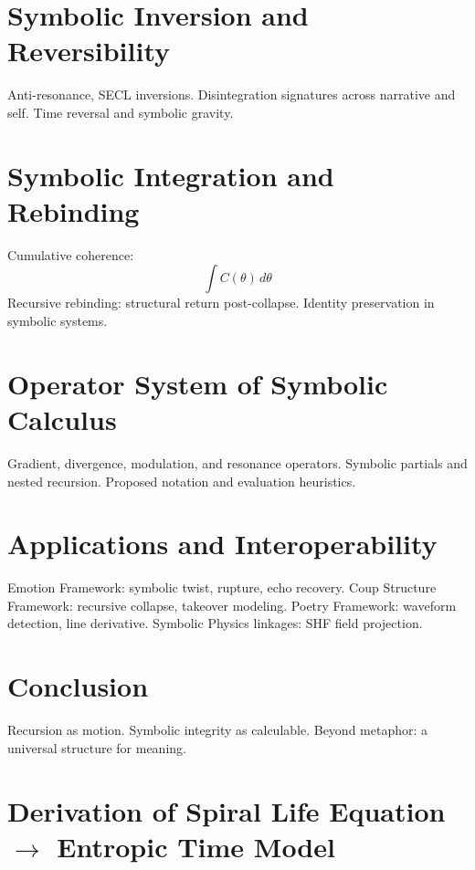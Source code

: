 \documentclass[12pt]{article}
\begin{document}
\section{Symbolic Inversion and Reversibility}
Anti-resonance, SECL inversions.\newline
Disintegration signatures across narrative and self.\newline
Time reversal and symbolic gravity.

\section{Symbolic Integration and Rebinding}
Cumulative coherence:
\[ \int C(\theta) \, d\theta \]
Recursive rebinding: structural return post-collapse.\newline
Identity preservation in symbolic systems.

\section{Operator System of Symbolic Calculus}
Gradient, divergence, modulation, and resonance operators.\newline
Symbolic partials and nested recursion.\newline
Proposed notation and evaluation heuristics.

\section{Applications and Interoperability}
Emotion Framework: symbolic twist, rupture, echo recovery.\newline
Coup Structure Framework: recursive collapse, takeover modeling.\newline
Poetry Framework: waveform detection, line derivative.\newline
Symbolic Physics linkages: SHF field projection.

\section{Conclusion}
Recursion as motion.\newline
Symbolic integrity as calculable.\newline
Beyond metaphor: a universal structure for meaning.

\appendix

\section{Derivation of Spiral Life Equation \texorpdfstring{$\rightarrow$}{→} Entropic Time Model}
\end{document}

